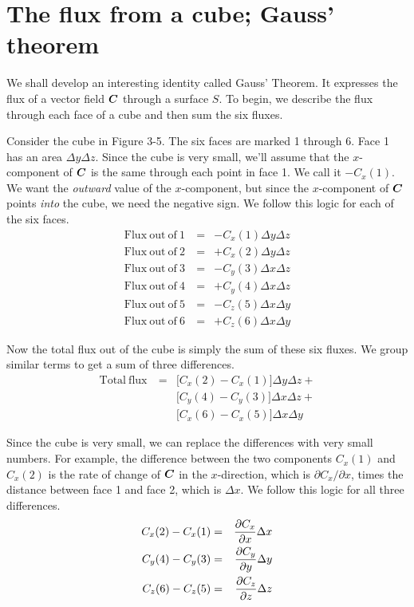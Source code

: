 \section{The flux from a cube; Gauss' theorem}

We shall develop an interesting identity called Gauss' Theorem.
It expresses the flux of a vector field $\boldsymbol{C}$ through a surface $S$.
To begin, we describe the flux through each face of a cube and then sum the six fluxes.

\newpage
Consider the cube in Figure 3-5.
The six faces are marked 1 through 6.
Face 1 has an area $\Delta y \Delta z$.
Since the cube is very small, we'll assume that the $x$-component of $\boldsymbol{C}$
is the same through each point in face 1. We call it $-C_x(1)$.
We want the \emph{outward} value of the $x$-component, 
but since the $x$-component of $\boldsymbol{C}$ points \emph{into} the cube,
we need the negative sign.
We follow this logic for each of the six faces.
\begin{eqnarray*}
  \mathrm{Flux\ out\ of\ 1\ } &=&  - C_x(1) \Delta y \Delta z \\
  \mathrm{Flux\ out\ of\ 2\ } &=&  + C_x(2) \Delta y \Delta z \\
  \mathrm{Flux\ out\ of\ 3\ } &=&  - C_y(3) \Delta x \Delta z \\
  \mathrm{Flux\ out\ of\ 4\ } &=&  + C_y(4) \Delta x \Delta z \\
  \mathrm{Flux\ out\ of\ 5\ } &=&  - C_z(5) \Delta x \Delta y \\
  \mathrm{Flux\ out\ of\ 6\ } &=&  + C_z(6) \Delta x \Delta y
\end{eqnarray*}

Now the total flux out of the cube is simply the sum of these six fluxes.
We group similar terms to get a sum of three differences.
\begin{eqnarray*}
  \mathrm{Total\ flux\ } &=&
  \big[ C_x(2) - C_x(1) \big] \Delta y \Delta z + \\
  & & \big[ C_y(4) - C_y(3) \big] \Delta x \Delta z + \\
  & & \big[ C_x(6) - C_x(5) \big] \Delta x \Delta y
\end{eqnarray*}

Since the cube is very small, we can replace the differences with very small numbers.
For example, the difference between the two components $C_x(1)$ and $C_x(2)$ is 
the rate of change of $\boldsymbol{C}$ in the $x$-direction, which is $\partial C_x / \partial x$, 
times the distance between face 1 and face 2, which is $\Delta x$.
We follow this logic for all three differences.
\begin{eqnarray*}
  C_x(2) - C_x(1) &=& \frac{\partial C_x}{\partial x} \Delta x \\
  C_y(4) - C_y(3) &=& \frac{\partial C_y}{\partial y} \Delta y \\
  C_z(6) - C_z(5) &=& \frac{\partial C_z}{\partial z} \Delta z
\end{eqnarray*}

